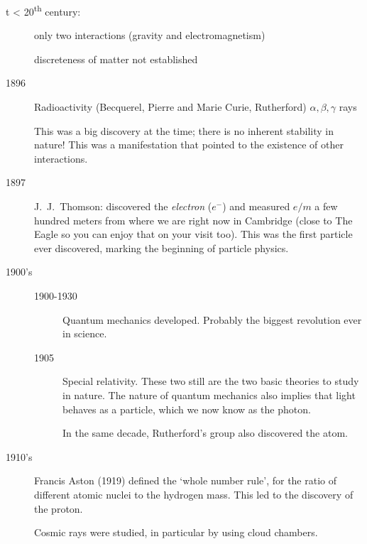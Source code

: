 \begin{description}
  \item[t < 20\textsuperscript{th} century:] only two interactions (gravity and electromagnetism)\par discreteness of matter not established
  \item[1896] Radioactivity (Becquerel, Pierre and Marie Curie, Rutherford) $\alpha, \beta, \gamma$ rays\par
    This was a big discovery at the time; there is no inherent stability in nature! This was a manifestation that pointed to the existence of other interactions.
  \item[1897] J.~J.~Thomson: discovered the \emph{electron} ($e^-$) and measured $e / m$ a few hundred meters from where we are right now in Cambridge (close to The Eagle so you can enjoy that on your visit too).
    This was the first particle ever discovered, marking the beginning of particle physics.
  \item[1900's]
    \begin{description}
      \item[1900-1930] Quantum mechanics developed. Probably the biggest revolution ever in science.
      \item[1905] Special relativity. These two still are the two basic theories to study in nature.
	The nature of quantum mechanics also implies that light behaves as a particle, which we now know as the photon.

	In the same decade, Rutherford's group also discovered the atom.
    \end{description}
  \item[1910's] Francis Aston (1919) defined the `whole number rule', for the ratio of different atomic nuclei to the hydrogen mass. This led to the discovery of the proton.

    Cosmic rays were studied, in particular by using cloud chambers.


\end{description}
